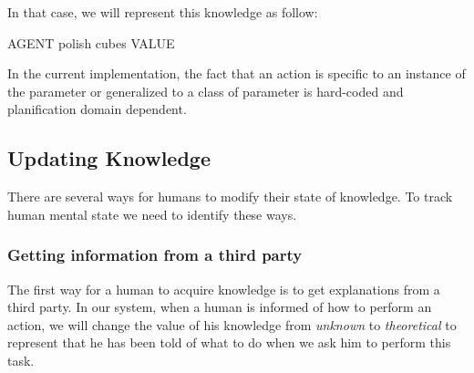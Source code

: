\documentclass{llncs}
\begin{document}
In that case, we will represent this knowledge as follow:

AGENT polish cubes VALUE

In the current implementation, the fact that an action is specific to an instance of the parameter or generalized to a class of parameter is hard-coded and planification domain dependent.


\subsection{Updating Knowledge}

There are several ways for humans to modify their state of knowledge. To track human mental state we need to identify these ways.

\subsubsection{Getting information from a third party}
The first way for a human to acquire knowledge is to get explanations from a third party. In our system, when a human is informed of how to perform an action, we will change the value of his knowledge from \textit{unknown} to \textit{theoretical} to represent that he has been told of what to do when we ask him to perform this task.

\end{document}
